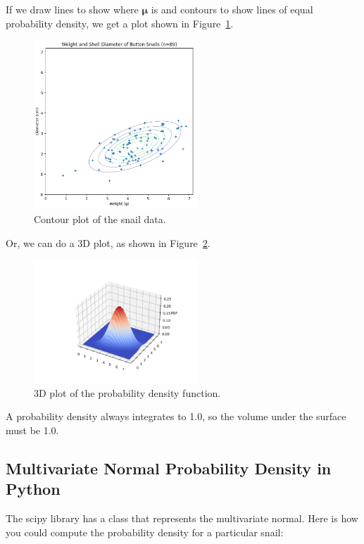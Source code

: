 If we draw lines to show where $\boldsymbol\mu$ is and contours to show lines of equal probability density, we get a plot shown in Figure~\ref{fig:contour_snail}.
\begin{figure}[htbp]
    \centering
    \includegraphics[width=0.55\textwidth]{contour.png}
    \caption{Contour plot of the snail data.}
    \label{fig:contour_snail}
\end{figure}

Or, we can do a 3D plot, as shown in Figure~\ref{fig:3d_snail}.
\begin{figure}[htbp]
    \centering
    \includegraphics[width=0.55\textwidth]{3d.png}
    \caption{3D plot of the probability density function.}
    \label{fig:3d_snail}
\end{figure}

A probability density always integrates to 1.0, so the volume under the surface must be 1.0.

\subsection{Multivariate Normal Probability Density in Python}

The scipy library has a class that represents the multivariate normal. Here is how you could compute the probability density for a particular snail:

